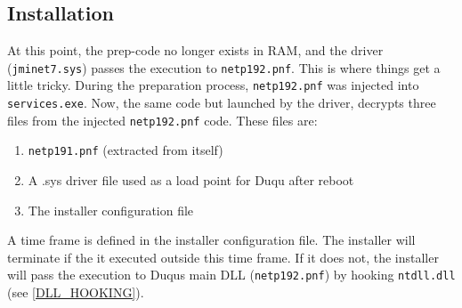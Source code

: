 \documentclass[12pt,english,a4paper]{article}
\begin{document}
\subsection{Installation}
At this point, the prep-code no longer exists in RAM, and the driver (\texttt{jminet7.sys}) passes the execution to \texttt{netp192.pnf}. This is where things get a little tricky. During the preparation process, \texttt{netp192.pnf} was injected into \texttt{services.exe}. Now, the same code but launched by the driver, decrypts three files from the injected \texttt{netp192.pnf} code. These files are:
 \begin{enumerate}
   \item \texttt{netp191.pnf} (extracted from itself)
   \item A .sys driver file used as a load point for Duqu after reboot
   \item The installer configuration file
  \end{enumerate}
A time frame is defined in the installer configuration file. The installer will terminate if the it executed outside this time frame. If it does not, the installer will pass the execution to Duqus main DLL (\texttt{netp192.pnf}) by hooking \texttt{ntdll.dll} (see \ref{DLL_HOOKING}).


\newpage
\printbibliography[title={Complete Bibliography},heading=bibintoc]
\end{document}
